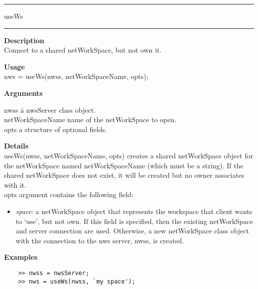 \rule[0.06in]{6in}{0.01in}
\newline
useWs
\newline
\rule{6in}{0.01in}
\begin{list}{}{}
	\item {\bf Description}\\
	Connect to a shared netWorkSpace, but not own it. 
	\item {\bf Usage}\\
	nws = useWs(nwss, netWorkSpaceName, opts);
	\item {\bf Arguments}
		\begin{tabbing}
		nwss \hspace{3.0cm} \= a nwsServer class object. \\
		netWorkSpaceName \> name of the netWorkSpace to open.\\
		opts \> a structure of optional fields.
		\end{tabbing}
	\item {\bf Details}\\
	useWs(nwss, netWorkSpaceName, opts) creates a shared netWorkSpace object
	for the netWorkSpace named netWorkSpaceName (which must be a string).
	If the shared netWorkSpace does not exist, it will be created but no owner
	associates with it. \\
	
	opts argument contains the following field:
	\begin{itemize}
	\item \textit{space}: a netWorkSpace object that represents the workspace that client wants to `use', but not own. 
	If this field is specified, then the existing netWorkSpace and server connection are used. Otherwise, a new netWorkSpace 
    class object with the connection to the nws server, nwss, is created.
	\end{itemize}
		
	\item {\bf Examples}
	\begin{verbatim}
	>> nwss = nwsServer;
	>> nws = useWs(nwss, `my space');
	\end{verbatim}
\end{list}

